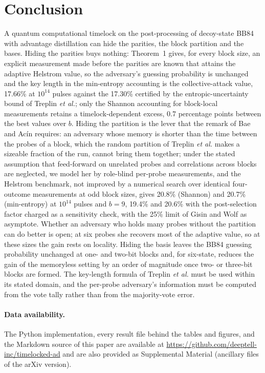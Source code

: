 \documentclass[aps,pra,twocolumn,superscriptaddress,nofootinbib]{revtex4-2}
\begin{document}
\section{Conclusion}
A quantum computational timelock on the post-processing of decoy-state BB84 with advantage distillation can hide the parities, the block partition and the bases. Hiding the parities buys nothing: Theorem~1 gives, for every block size, an explicit measurement made before the parities are known that attains the adaptive Helstrom value, so the adversary's guessing probability is unchanged and the key length in the min-entropy accounting is the collective-attack value, 17.66\% at $10^{14}$ pulses against the 17.30\% certified by the entropic-uncertainty bound of Treplin \emph{et al.}; only the Shannon accounting for block-local measurements retains a timelock-dependent excess, 0.7 percentage points between the best values over $b$. Hiding the partition is the lever that the remark of Bae and Acín requires: an adversary whose memory is shorter than the time between the probes of a block, which the random partition of Treplin \emph{et al.} makes a sizeable fraction of the run, cannot bring them together; under the stated assumption that feed-forward on unrelated probes and correlations across blocks are neglected, we model her by role-blind per-probe measurements, and the Helstrom benchmark, not improved by a numerical search over identical four-outcome measurements at odd block sizes, gives 20.8\% (Shannon) and 20.7\% (min-entropy) at $10^{14}$ pulses and $b=9$, 19.4\% and 20.6\% with the post-selection factor charged as a sensitivity check, with the 25\% limit of Gisin and Wolf as asymptote. Whether an adversary who holds many probes without the partition can do better is open; at six probes she recovers most of the adaptive value, so at these sizes the gain rests on locality. Hiding the basis leaves the BB84 guessing probability unchanged at one- and two-bit blocks and, for six-state, reduces the gain of the memoryless setting by an order of magnitude once two- or three-bit blocks are formed. The key-length formula of Treplin \emph{et al.} must be used within its stated domain, and the per-probe adversary's information must be computed from the vote tally rather than from the majority-vote error.

\paragraph*{Data availability.} The Python implementation, every result file behind the tables and figures, and the Markdown source of this paper are available at \url{https://github.com/deeptell-inc/timelocked-ad} and are also provided as Supplemental Material (ancillary files of the arXiv version).
\appendix
\end{document}
